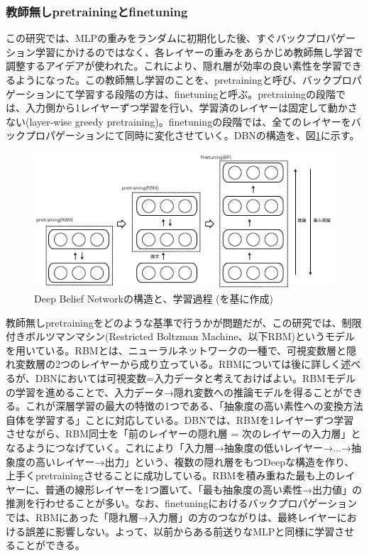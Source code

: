 \subsubsection{教師無しpretrainingとfinetuning}
この研究では、MLPの重みをランダムに初期化した後、すぐバックプロパゲーション学習にかけるのではなく、各レイヤーの重みをあらかじめ教師無し学習で調整するアイデアが使われた。これにより、隠れ層が効率の良い素性を学習できるようになった。この教師無し学習のことを、pretrainingと呼び、バックプロパゲーションにて学習する段階の方は、finetuningと呼ぶ。pretrainingの段階では、入力側から1レイヤーずつ学習を行い、学習済のレイヤーは固定して動かさない(layer-wise greedy pretraining)。finetuningの段階では、全てのレイヤーをバックプロパゲーションにて同時に変化させていく。DBNの構造を、図\ref{c3_dbn}に示す。\par
\begin{figure}[tbp]
 \centering
  \includegraphics[width=120mm]{img/c3/dbn}
 \caption{Deep Belief Networkの構造と、学習過程 (\cite{hinton2006a-fast, hinton2006reducing}を基に作成)}
 \label{c3_dbn}
\end{figure}
教師無しpretrainingをどのような基準で行うかが問題だが、この研究では、制限付きボルツマンマシン(Restricted Boltzman Machine、以下RBM)というモデルを用いている。RBMとは、ニューラルネットワークの一種で、可視変数層と隠れ変数層の2つのレイヤーから成り立っている。RBMについては後に詳しく述べるが、DBNにおいては可視変数=入力データと考えておけばよい。RBMモデルの学習を進めることで、入力データ→隠れ変数への推論モデルを得ることができる。これが深層学習の最大の特徴の1つである、「抽象度の高い素性への変換方法自体を学習する」ことに対応している。DBNでは、RBMを1レイヤーずつ学習させながら、RBM同士を「前のレイヤーの隠れ層 = 次のレイヤーの入力層」となるようにつなげていく。これにより「入力層→抽象度の低いレイヤー→...→抽象度の高いレイヤー→出力」という、複数の隠れ層をもつDeepな構造を作り、上手くpretrainingさせることに成功している。RBMを積み重ねた最も上のレイヤーに、普通の線形レイヤーを1つ置いて、「最も抽象度の高い素性→出力値」の推測を行わせることが多い。なお、finetuningにおけるバックプロパゲーションでは、RBMにあった「隠れ層→入力層」の方のつながりは、最終レイヤーにおける誤差に影響しない。よって、以前からある前送りなMLPと同様に学習させることができる。
